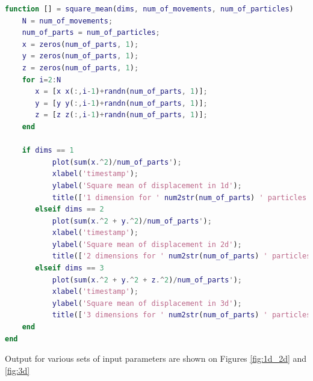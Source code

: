 \documentclass[onecolumn]{article}
\begin{document}
\begin{lstlisting}[language=Matlab,frame=single,label={lst:sqare_mean},breaklines=true,caption={Function that calculates square mean of displacement}]
function [] = square_mean(dims, num_of_movements, num_of_particles)
    N = num_of_movements;
    num_of_parts = num_of_particles;
    x = zeros(num_of_parts, 1);
    y = zeros(num_of_parts, 1);
    z = zeros(num_of_parts, 1);
    for i=2:N
       x = [x x(:,i-1)+randn(num_of_parts, 1)];
       y = [y y(:,i-1)+randn(num_of_parts, 1)];
       z = [z z(:,i-1)+randn(num_of_parts, 1)];
    end

    if dims == 1
           plot(sum(x.^2)/num_of_parts');
           xlabel('timestamp');
           ylabel('Square mean of displacement in 1d');
           title(['1 dimension for ' num2str(num_of_parts) ' particles']);
       elseif dims == 2
           plot(sum(x.^2 + y.^2)/num_of_parts');
           xlabel('timestamp');
           ylabel('Square mean of displacement in 2d');
           title(['2 dimensions for ' num2str(num_of_parts) ' particles']);
       elseif dims == 3
           plot(sum(x.^2 + y.^2 + z.^2)/num_of_parts');
           xlabel('timestamp');
           ylabel('Square mean of displacement in 3d');
           title(['3 dimensions for ' num2str(num_of_parts) ' particles']);
    end
end
\end{lstlisting}

\vspace{1em}
Output for various sets of input parameters are shown on Figures \ref{fig:1d_2d} and \ref{fig:3d}
\end{document}
